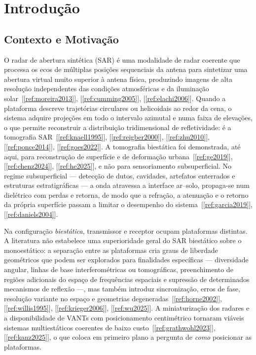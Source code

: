 \documentclass[12pt,a4paper,oneside]{book}
\theoremstyle{remark}
\newcommand{\citar}[1]{[\ref{ref:#1}]}
\theoremstyle{plain}
\theoremstyle{definition}
\begin{document}
\mainmatter

\chapter{Introdução}
\label{cap:intro}

\section{Contexto e Motivação}
\label{sec:intro_contexto}

O radar de abertura sintética (SAR) é uma modalidade de radar coerente que
processa os ecos de múltiplas posições sequenciais da antena para sintetizar
uma abertura virtual muito superior à antena física, produzindo imagens de alta
resolução independentes das condições atmosféricas e da iluminação
solar~\citar{moreira2013}, \citar{cumming2005}, \citar{elachi2006}. Quando a plataforma descreve trajetórias circulares
ou helicoidais ao redor da cena, o sistema adquire projeções em todo o
intervalo azimutal e numa faixa de elevações, o que permite reconstruir a
distribuição tridimensional de refletividade: é a tomografia
SAR~\citar{knaell1995}, \citar{reigber2000}, \citar{zhu2010}, \citar{ponce2014}, \citar{goes2022}.
A tomografia biestática foi demonstrada, até aqui, para reconstrução de
superfície e de deformação urbana~\citar{ge2019}, \citar{chenz2024}, \citar{he2025},
e não para sensoriamento subsuperficial.
No regime subsuperficial --- detecção de dutos, cavidades, artefatos
enterrados e estruturas estratigráficas --- a onda atravessa a interface
ar--solo, propaga-se num dielétrico com perdas e retorna, de modo que a
refração, a atenuação e o retorno da própria superfície passam a limitar o
desempenho do sistema~\citar{garcia2019}, \citar{daniels2004}.

Na configuração \emph{biestática}, transmissor e receptor ocupam plataformas
distintas. A literatura não estabelece uma superioridade geral do SAR
biestático sobre o monoestático: a separação entre as plataformas cria graus
de liberdade geométricos que podem ser explorados para finalidades
específicas --- diversidade angular, linhas de base interferométricas ou
tomográficas, preenchimento de regiões adicionais do espaço de frequências
espaciais e supressão de determinados mecanismos de reflexão ---, mas também
introduz sincronização, erros de fase, resolução variante no espaço e
geometrias degeneradas~\citar{horne2002}, \citar{willis1995}, \citar{krieger2006}, \citar{wu2025}.
A miniaturização dos radares e a disponibilidade de VANTs com posicionamento
centimétrico tornaram viáveis sistemas multiestáticos coerentes de baixo
custo~\citar{grathwohl2023}, \citar{kanz2025}, o que coloca em primeiro plano a
pergunta de \emph{como} posicionar as plataformas.
\end{document}

